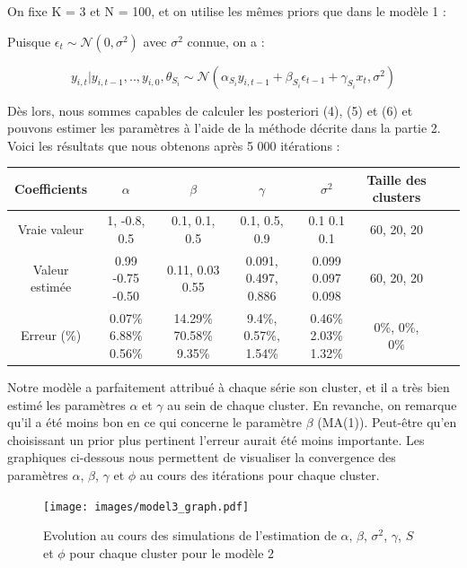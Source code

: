On fixe K = 3 et N = 100, et on utilise les mêmes priors que dans le modèle 1 : 

Puisque $\epsilon_t \sim \mathcal{N}(0,\sigma^2)$ avec $\sigma^2$ connue, on a :

\begin{equation*}
y_{i,t}|y_{i,t-1},..,y_{i,0},\theta_{S_i} \sim \mathcal{N}(\alpha_{S_i}y_{i,t-1} + \beta_{S_i}\epsilon_{t-1} + \gamma_{S_i}x_t, \sigma^2) 
\end{equation*}

Dès lors, nous sommes capables de calculer les posteriori (4), (5) et (6) et pouvons estimer les paramètres à l'aide de la méthode décrite dans la partie 2.
\newline
Voici les résultats que nous obtenons après 5 000 itérations : 
\newline
\begin{small}
\begin{center}
\begin{tabular}{|c|c|c|c|c|c|c|c|}
        \hline
        \textbf{Coefficients} & $\alpha$ & $\beta$ & $\gamma$ & $\sigma^2$ &Taille des clusters\\ 
        \hline
        Vraie valeur & 1, -0.8, 0.5  & 0.1, 0.1, 0.5 & 0.1, 0.5, 0.9 & 0.1 0.1 0.1 & 60, 20, 20 \\ 
        \hline
        Valeur estimée & 0.99 -0.75 -0.50 & 0.11, 0.03 0.55 & 0.091, 0.497, 0.886 & 0.099 0.097 0.098 &60, 20, 20\\
        \hline
        Erreur (\%) & 0.07\% 6.88\% 0.56\% & 14.29\% 70.58\% 9.35\% & 9.4\%, 0.57\%, 1.54\% & 0.46\% 2.03\% 1.32\% &0\%, 0\%, 0\%\\
        \hline
\end{tabular} 
\end{center}
\end{small}
\vspace{0.4cm}
\newline 
Notre modèle a parfaitement attribué à chaque série son cluster, et il a très bien estimé les paramètres $\alpha$ et $\gamma$ au sein de chaque cluster. En revanche, on remarque qu'il a été moins bon en ce qui concerne le paramètre $\beta$ (MA(1)). Peut-être qu'en choisissant un prior plus pertinent l'erreur aurait été moins importante.
\newline
Les graphiques ci-dessous nous permettent de visualiser la convergence des paramètres $\alpha$, $\beta$, $\gamma$ et $\phi$ au cours des itérations pour chaque cluster.

\begin{figure}[h]
    \centering
    \texttt{[image: images/model3\_graph.pdf]}
    \caption{Evolution au cours des simulations de l'estimation de $\alpha$, $\beta$, $\sigma^2$, $\gamma$, $S$ et $\phi$ pour chaque cluster pour le modèle 2}
\end{figure}

